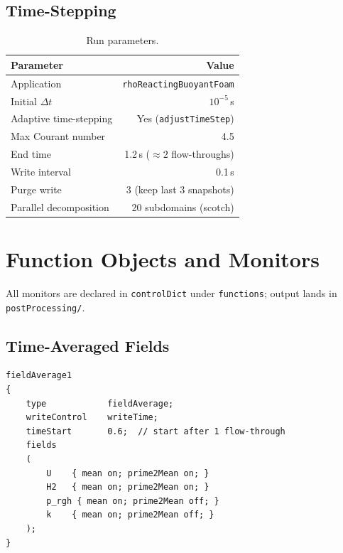 \documentclass[12pt,a4paper]{report}
\begin{document}
\section{Time-Stepping}

\begin{table}[H]
\centering
\caption{Run parameters.}
\begin{tabular}{@{}lr@{}}
\toprule
\textbf{Parameter} & \textbf{Value} \\
\midrule
Application            & \texttt{rhoReactingBuoyantFoam} \\
Initial $\Delta t$     & $10^{-5}$\,s \\
Adaptive time-stepping & Yes (\texttt{adjustTimeStep}) \\
Max Courant number     & 4.5 \\
End time               & 1.2\,s ($\approx 2$ flow-throughs) \\
Write interval         & 0.1\,s \\
Purge write            & 3 (keep last 3 snapshots) \\
Parallel decomposition & 20 subdomains (scotch) \\
\bottomrule
\end{tabular}
\end{table}


\chapter{Function Objects and Monitors}
\label{ch:monitors}

All monitors are declared in \texttt{controlDict} under
\texttt{functions}; output lands in \texttt{postProcessing/}.

\section{Time-Averaged Fields}

\begin{lstlisting}[language={},numbers=none]
fieldAverage1
{
    type            fieldAverage;
    writeControl    writeTime;
    timeStart       0.6;  // start after 1 flow-through
    fields
    (
        U    { mean on; prime2Mean on; }
        H2   { mean on; prime2Mean on; }
        p_rgh { mean on; prime2Mean off; }
        k    { mean on; prime2Mean off; }
    );
}
\end{lstlisting}
\end{document}

